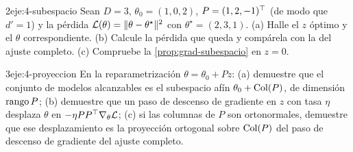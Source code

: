 \begin{ejercicio}{2}{eje:4-subespacio}
Sean $D=3$, $\theta_0=(1,0,2)$, $P=(1,2,-1)^{\top}$ (de modo que $d'=1$) y la pérdida $\mathcal{L}(\theta)=\lVert\theta-\theta^{\star}\rVert^{2}$ con $\theta^{\star}=(2,3,1)$. (a) Halle el $z$ óptimo y el $\theta$ correspondiente. (b) Calcule la pérdida que queda y compárela con la del ajuste completo. (c) Compruebe la \cref{prop:grad-subespacio} en $z=0$.
\end{ejercicio}

\begin{ejercicio}{3}{eje:4-proyeccion}
En la reparametrización $\theta=\theta_0+Pz$: (a) demuestre que el conjunto de modelos alcanzables es el subespacio afín $\theta_0+\operatorname{Col}(P)$, de dimensión $\operatorname{rango} P$; (b) demuestre que un paso de descenso de gradiente en $z$ con tasa $\eta$ desplaza $\theta$ en $-\eta PP^{\top}\nabla_\theta\mathcal{L}$; (c) si las columnas de $P$ son ortonormales, demuestre que ese desplazamiento es la proyección ortogonal sobre $\operatorname{Col}(P)$ del paso de descenso de gradiente del ajuste completo.
\end{ejercicio}
